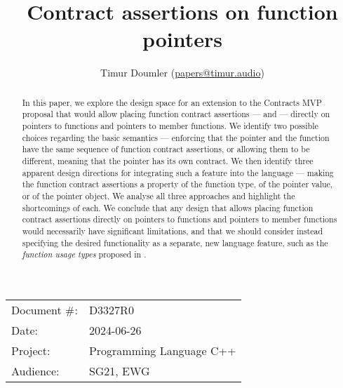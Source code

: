 

 \usepackage[bottom]{footmisc} 

 \usepackage{longtable}


\usepackage{tikz,lipsum,lmodern}
\usepackage[most]{tcolorbox}



\usepackage{titlesec}
\usepackage{tocloft}


\newcommand{\changelocaltocdepth}[1]{%
  \addtocontents{toc}{\protect\setcounter{tocdepth}{#1}}%
  \setcounter{tocdepth}{#1}%
}

\setcounter{tocdepth}{3}



\title{Contract assertions on function pointers}
\author{ Timur Doumler \small(\href{mailto:papers@timur.audio}{papers@timur.audio}) 
}
\date{}
\maketitle

\begin{tabular}{ll}
Document \#: & D3327R0 \\
Date: &2024-06-26 \\
Project: & Programming Language C++ \\
Audience: & SG21, EWG
\end{tabular}

\begin{abstract}
In this paper, we explore the design space for an extension to the Contracts MVP proposal \cite{P2900R7} that would allow placing function contract assertions ---  and  --- directly on pointers to functions and pointers to member functions. We identify two possible choices regarding the basic semantics --- enforcing that the pointer and the function have the same sequence of function contract assertions, or allowing them to be different, meaning that the pointer has its own contract. We then identify three apparent design directions for integrating such a feature into the language --- making the function contract assertions a property of the function type, of the pointer value, or of the pointer object. We analyse all three approaches and highlight the shortcomings of each. We conclude that any design that allows placing function contract assertions directly on pointers to functions and pointers to member functions would necessarily have significant limitations, and that we should consider instead specifying the desired functionality as a separate, new language feature, such as the \emph{function usage types} proposed in \cite{P3271R0}.
\end{abstract}

